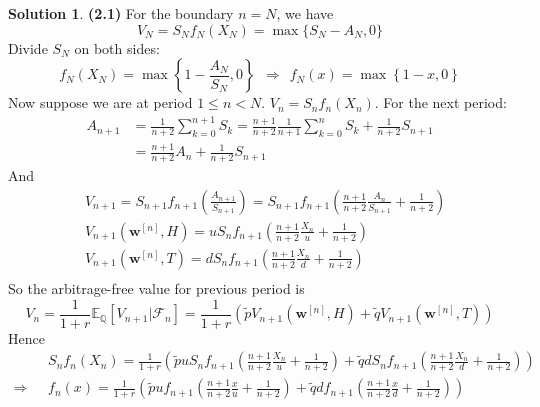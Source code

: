 \documentclass[a4paper, 10pt]{article}
\theoremstyle{definition}
\theoremstyle{hSol}
\newtheorem*{solution}{Solution}
\begin{document}
\begin{solution} \textbf{(2.1)} For the boundary $n=N$, we have
\begin{equation}
  V_N = S_N f_N(X_N) = \max\{S_N - A_N, 0\}
\end{equation}
Divide $S_N$ on both sides:
\begin{equation}
  f_N(X_N) = \max\left\{1 - \frac{A_N}{S_N}, 0\right\}~~\Rightarrow~~f_N(x) = \max\left\{1 - x, 0\right\}
\end{equation}
Now suppose we are at period $1\leq n<N$. $V_n = S_nf_n(X_n)$. For the next period:
\begin{equation}
  \begin{split}
    A_{n+1} &= \frac{1}{n+2}\sum_{k=0}^{n+1} S_k = \frac{n+1}{n+2}\frac{1}{n+1}\sum_{k=0}^{n} S_k + \frac{1}{n+2}S_{n+1}\\
    &=\frac{n+1}{n+2}A_n + \frac{1}{n+2}S_{n+1}
  \end{split}
\end{equation}
And
\begin{equation}
  \begin{split}
    &V_{n+1} = S_{n+1} f_{n+1}\left(\frac{A_{n+1}}{S_{n+1}}\right) = S_{n+1} f_{n+1}\left(\frac{n+1}{n+2}\frac{A_n}{S_{n+1}}+\frac{1}{n+2}\right)\\
    &V_{n+1}(\bm{w}^{[n]}, H) = uS_{n} f_{n+1}\left(\frac{n+1}{n+2}\frac{X_n}{u}+\frac{1}{n+2}\right)\\
    &V_{n+1}(\bm{w}^{[n]}, T) = dS_{n} f_{n+1}\left(\frac{n+1}{n+2}\frac{X_n}{d}+\frac{1}{n+2}\right)\\
  \end{split}
\end{equation}
So the arbitrage-free value for previous period is
\begin{equation}
  V_n = \frac{1}{1+r} \mathbb{E}_{\mathbb{Q}}\left[V_{n+1}| \mathcal{F}_n\right] = \frac{1}{1+r}\left(\tilde{p}V_{n+1}(\bm{w}^{[n]}, H) + \tilde{q}V_{n+1}(\bm{w}^{[n]}, T)\right)
\end{equation}
Hence
\begin{equation}
  \begin{split}
    &S_nf_n(X_n) = \tfrac{1}{1+r}\left(\tilde{p}uS_{n} f_{n+1}\left(\tfrac{n+1}{n+2}\tfrac{X_n}{u}+\tfrac{1}{n+2}\right) + \tilde{q}dS_{n} f_{n+1}\left(\tfrac{n+1}{n+2}\tfrac{X_n}{d}+\tfrac{1}{n+2}\right)\right) \\
    \Rightarrow ~~~&f_n(x) = \tfrac{1}{1+r}\left(\tilde{p}u f_{n+1}\left(\tfrac{n+1}{n+2}\tfrac{x}{u}+\tfrac{1}{n+2}\right) + \tilde{q}d f_{n+1}\left(\tfrac{n+1}{n+2}\tfrac{x}{d}+\tfrac{1}{n+2}\right)\right)

\end{split}
\end{equation}
\end{solution}
\end{document}
